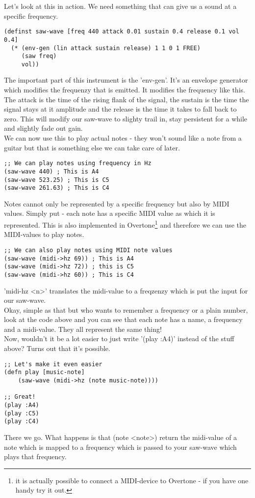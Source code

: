 Let's look at this in action. We need something that can give us a sound at a specific frequency. 

\begin{lstlisting}
(definst saw-wave [freq 440 attack 0.01 sustain 0.4 release 0.1 vol 0.4] 
  (* (env-gen (lin attack sustain release) 1 1 0 1 FREE)
     (saw freq)
     vol))
\end{lstlisting}
The important part of this instrument is the 'env-gen'. It's an envelope generator which modifies the frequenzy that is emitted. It modifies the frequency like this. The attack is the time of the rising flank of the signal, the sustain is the time the signal stays at it amplitude and the release is the time it takes to fall back to zero. This will modify our saw-wave to slighty trail in, stay persistent for a while and slightly fade out gain.\\
We can now use this to play actual notes - they won't sound like a note from a guitar but that is something else we can take care of later.
\begin{lstlisting}
;; We can play notes using frequency in Hz
(saw-wave 440) ; This is A4
(saw-wave 523.25) ; This is C5
(saw-wave 261.63) ; This is C4
\end{lstlisting}

Notes cannot only be represented by a specific frequency but also by \gls{MIDI} values. Simply put - each note has a specific MIDI value as which it is represented. This is also implemented in Overtone\footnote{it is actually possible to connect a MIDI-device to Overtone - if you have one handy try it out.} and therefore we can use the MIDI-values to play notes.
\begin{lstlisting}
;; We can also play notes using MIDI note values
(saw-wave (midi->hz 69)) ; This is A4
(saw-wave (midi->hz 72)) ; this is C5
(saw-wave (midi->hz 60)) ; This is C4
\end{lstlisting}
'midi-hz <n>' translates the midi-value to a freqzenzy which is put the input for our saw-wave.\\
Okay, simple as that but who wants to remember a frequency or a plain number, look at the code above and you can see that each note has a name, a frequency and a midi-value. They all represent the same thing!\\ Now, wouldn't it be a lot easier to just write '(play :A4)' instead of the stuff above? Turns out that it's possible.
\begin{lstlisting}
;; Let's make it even easier
(defn play [music-note]
    (saw-wave (midi->hz (note music-note))))

;; Great!
(play :A4)
(play :C5)
(play :C4)
\end{lstlisting}
There we go. What happens is that (note <note>) return the midi-value of a note which is mapped to a frequency which is passed to your saw-wave which plays that frequency.\\

